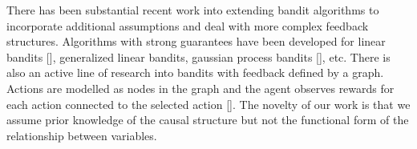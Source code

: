 

There has been substantial recent work into extending bandit algorithms to incorporate additional assumptions and deal with more complex feedback structures. Algorithms with strong guarantees have been developed for linear bandits [], generalized linear bandits, gaussian process bandits [], etc. There is also an active line of research into bandits with feedback defined by a graph. Actions are modelled as nodes in the graph and the agent observes rewards for each action connected to the selected action []. The novelty of our work is that we assume prior knowledge of the causal structure but not the functional form of the relationship between variables.   


